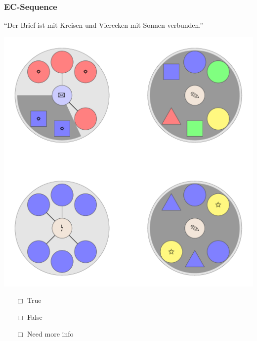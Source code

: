 \documentclass[fleqn,10pt,xcolor=dvipsnames]{beamer}
\newcommand{\EC}{EC\xspace}
\newcommand{\mymark}[1]{{\color{mycol}{#1}}}
\begin{document}
\begin{frame}
  \frametitle{\EC-Sequence}
  \begin{center}
    ``Der Brief ist mit Kreisen und Vierecken mit Sonnen verbunden.''

    \vspace{0.1cm}

    \includegraphics[width=0.5 \textwidth]{../../pictures/ec_01_3.pdf}

    \vspace{0.1cm}

    \begin{multicols}{3}
      \begin{itemize} 
      \item[$\Box$] True\\
        \onslide<2>{$\leadsto$  \mymark{false}}
      \item[$\Box$] False\\
        \onslide<2>{$\leadsto$ \mymark{EC}}
      \item[$\Box$] Need more info 
      \end{itemize}
    \end{multicols}

  \end{center}
\end{frame}
\end{document}
